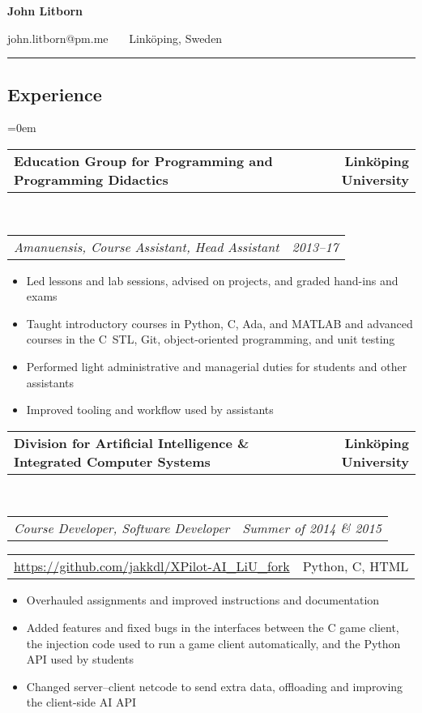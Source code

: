 \documentclass[10pt,letterpaper]{article}
\makeatletter
\newcommand{\headerrow}[2]
{\begin{tabular*}{\linewidth}{l@{\extracolsep{\fill}}r}
    #1 &
    #2 \\
\end{tabular*}}
\newcommand{\CPP}
{C\nolinebreak[4]\hspace{-.05em}\raisebox{.22ex}{\footnotesize\bf ++}}
\makeatother
\begin{document}
\begin{center}
    {\LARGE \textbf{John Litborn}}

    john.litborn@pm.me
    \ \textbullet \ \
    Linköping, Sweden
\end{center}

\hrule
\vspace{-0.4em}
\subsection*{Experience}

\parindent=0em
\headerrow
{\textbf{Education Group for Programming and Programming
Didactics}}
{\textbf{Linköping University}}
\\
\headerrow
{\emph{Amanuensis, Course Assistant, Head Assistant}}
{\emph{2013--17}}
\begin{itemize}[noitemsep, topsep=0pt]
    \item Led lessons and lab sessions, advised on projects, and graded
        hand-ins and exams
    \item Taught introductory courses in Python, \CPP, Ada, and MATLAB and
        advanced courses in the \CPP \ STL, Git, object-oriented programming,
        and unit testing
    \item Performed light administrative and managerial duties for students
        and other assistants
    \item Improved tooling and workflow used by assistants
\end{itemize}
\vspace{0.5em}
\headerrow
{\textbf{Division for Artificial Intelligence \& Integrated Computer Systems}}
{\textbf{Linköping University}}
\\
\headerrow
{\emph{Course Developer, Software Developer}}
{\emph{Summer of 2014 \& 2015}}
\headerrow
{\url{https://github.com/jakkdl/XPilot-AI\_LiU\_fork}}
{Python, C, HTML}
\begin{itemize}[noitemsep, topsep=0pt]
    \item Overhauled assignments and improved instructions and
        documentation
    \item Added features and fixed bugs in the interfaces
        between the C game client, the injection code used to run a game
        client automatically, and the Python API used by students
    \item Changed server--client netcode to send extra data, offloading and
        improving the client-side AI API
\end{itemize}
\vspace{0.5em}
\end{document}
